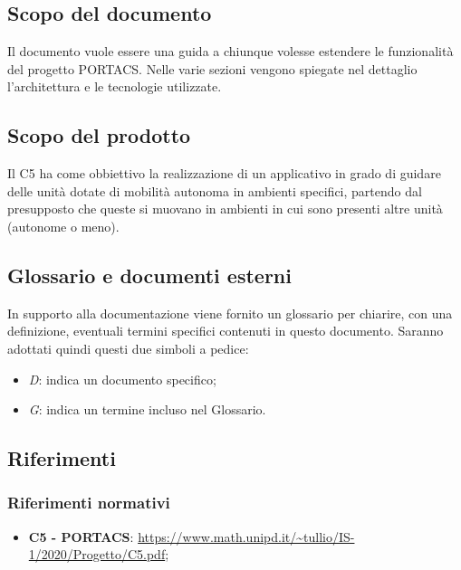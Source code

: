 \subsection{Scopo del documento}
	Il documento vuole essere una guida a chiunque volesse estendere le funzionalità del progetto PORTACS. Nelle varie sezioni vengono spiegate nel dettaglio l'architettura e le tecnologie utilizzate.

\subsection{Scopo del prodotto}
	Il  C5 ha come obbiettivo la realizzazione di un applicativo  in grado di guidare delle unità dotate di mobilità autonoma in ambienti specifici, partendo dal presupposto che queste si muovano in ambienti in cui sono presenti altre unità (autonome o meno).

\subsection{Glossario e documenti esterni}
	In supporto alla documentazione viene fornito un glossario per chiarire, con una definizione, eventuali termini specifici contenuti in questo documento.
	Saranno adottati quindi questi due simboli a pedice:
	\begin{itemize}
		\item \textit{D}: indica un documento specifico;
		\item \textit{G}: indica un termine incluso nel Glossario.
	\end{itemize}

\subsection{Riferimenti}
	\subsubsection{Riferimenti normativi}
	\begin{itemize}
		\item \textbf{{ C5 - PORTACS}}: \url{https://www.math.unipd.it/~tullio/IS-1/2020/Progetto/C5.pdf};
	\end{itemize}
